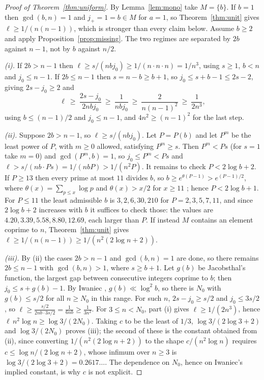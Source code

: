 \documentclass[11pt]{amsart}
\theoremstyle{plain}
\theoremstyle{definition}
\begin{document}
\begin{proof}[Proof of Theorem~\ref{thm:uniform}]
By Lemma~\ref{lem:mono} take $M=\{b\}$. If $b=1$ then $\gcd(b,n)=1$ and $j_+=1=b\in M$ for $a=1$,
so Theorem~\ref{thm:unit} gives $\ell\ge 1/(n(n-1))$, which is stronger than every claim below.
Assume $b\ge2$ and apply Proposition~\ref{prop:missing}. The two regimes are separated by $2b$
against $n-1$, not by $b$ against $n/2$.

\emph{(i).} If $2b>n-1$ then $\ell\ge s/(nbj_0)\ge 1/(n\cdot n\cdot n)=1/n^{3}$, using $s\ge1$,
$b<n$ and $j_0\le n-1$. If $2b\le n-1$ then $s=n-b\ge b+1$, so $j_0\le s+b-1\le 2s-2$, giving
$2s-j_0\ge2$ and
\[
  \ell\ \ge\ \frac{2s-j_0}{2nbj_0}\ \ge\ \frac{1}{nbj_0}\ \ge\ \frac{2}{n(n-1)^{2}}\ \ge\ \frac{1}{2n^{3}},
\]
using $b\le(n-1)/2$ and $j_0\le n-1$, and $4n^{2}\ge(n-1)^{2}$ for the last step.

\emph{(ii).} Suppose $2b>n-1$, so $\ell\ge s/(nbj_0)$. Let $P=P(b)$ and let $P^m$ be the least power
of $P$, with $m\ge0$ allowed, satisfying $P^m\ge s$. Then $P^m<Ps$ (for $s=1$ take $m=0$) and
$\gcd(P^m,b)=1$, so $j_0\le P^m<Ps$ and $\ell> s/(nb\cdot Ps)=1/(nbP)>1/(n^{2}P)$. It remains to
check $P<2\log b+2$. If $P\ge13$ then every prime at most $11$ divides $b$, so
$b\ge e^{\theta(P-1)}>e^{(P-1)/2}$, where $\theta(x)=\sum_{p\le x}\log p$ and $\theta(x)>x/2$ for
$x\ge11$ \cite{rs};
hence $P<2\log b+1$. For $P\le11$ the least admissible $b$ is $3,2,6,30,210$ for $P=2,3,5,7,11$, and
since $2\log b+2$ increases with $b$ it suffices to check those: the values are
$4.20,3.39,5.58,8.80,12.69$, each larger than $P$. If instead $M$ contains an element coprime to
$n$, Theorem~\ref{thm:unit} gives $\ell\ge 1/(n(n-1))\ge 1/(n^{2}(2\log n+2))$.

\emph{(iii).} By (ii) the cases $2b>n-1$ and $\gcd(b,n)=1$ are done, so there remains $2b\le n-1$
with $\gcd(b,n)>1$, where $s\ge b+1$. Let $g(b)$ be Jacobsthal's function, the largest gap between
consecutive integers coprime to $b$; then $j_0\le s+g(b)-1$. By Iwaniec \cite{iwaniec},
$g(b)\ll\log^{2}b$, so there is $N_0$ with $g(b)\le s/2$ for all $n\ge N_0$ in this range. For such
$n$, $2s-j_0\ge s/2$ and $j_0\le 3s/2$, so
$\ell\ge \frac{s/2}{2nb\cdot 3s/2}=\frac{1}{6nb}\ge\frac{1}{3n^{2}}$. For $3\le n<N_0$, part (i)
gives $\ell\ge 1/(2n^{3})$, hence $\ell\,n^{2}\log n\ge \log 3/(2N_0)$. Taking $c$ to be the least of
$1/3$, $\log 3/(2\log 3+2)$ and $\log 3/(2N_0)$ proves (iii); the second of these is the constant
obtained from (ii), since converting $1/(n^{2}(2\log n+2))$ to the shape $c/(n^{2}\log n)$ requires
$c\le\log n/(2\log n+2)$, whose infimum over $n\ge3$ is $\log 3/(2\log 3+2)=0.2617\ldots$. The
dependence on $N_0$, hence on Iwaniec's implied constant, is why $c$ is not explicit.
\end{proof}
\end{document}
